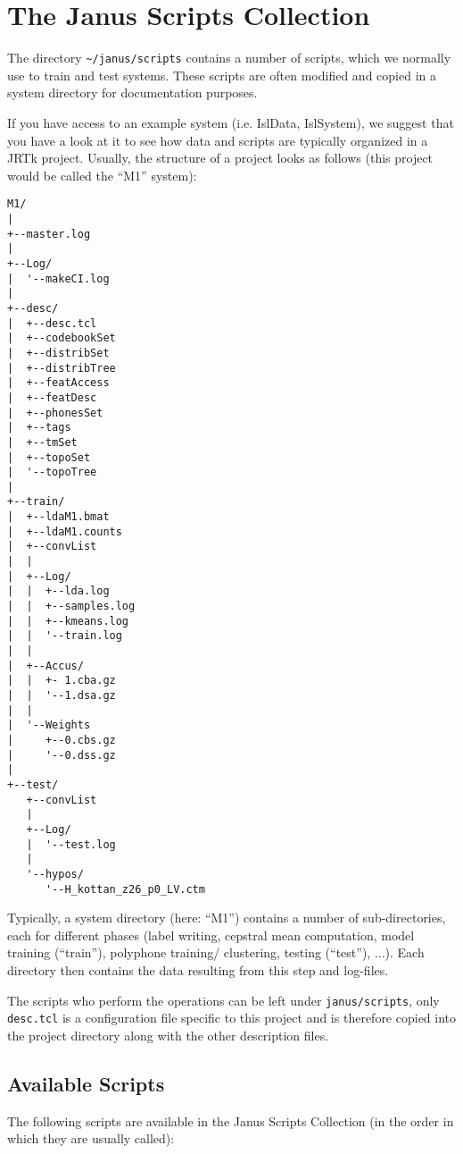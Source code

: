 \section{The Janus Scripts Collection} \label{janus:scripts}

The  directory  \texttt{\~{ }/janus/scripts}  contains  a  number  of
scripts, which   we  normally use  to train  and   test systems. These
scripts  are  often modified and    copied in a  system  directory for
documentation purposes.

If you have access to an example system  (i.e. IslData, IslSystem), we
suggest that  you have a  look at it  to see how  data and scripts are
typically  organized in a  JRTk project.  Usually,  the structure of a
project  looks as  follows (this  project  would be called the  ``M1''
system):

{\small
\begin{verbatim}
M1/
|
+--master.log
|
+--Log/
|  '--makeCI.log
|    
+--desc/
|  +--desc.tcl
|  +--codebookSet
|  +--distribSet
|  +--distribTree
|  +--featAccess
|  +--featDesc
|  +--phonesSet
|  +--tags
|  +--tmSet
|  +--topoSet
|  '--topoTree
|
+--train/
|  +--ldaM1.bmat
|  +--ldaM1.counts
|  +--convList
|  |
|  +--Log/
|  |  +--lda.log
|  |  +--samples.log
|  |  +--kmeans.log
|  |  '--train.log
|  |
|  +--Accus/
|  |  +- 1.cba.gz
|  |  '--1.dsa.gz
|  |
|  '--Weights
|     +--0.cbs.gz
|     '--0.dss.gz
|
+--test/
   +--convList
   |
   +--Log/
   |  '--test.log
   |
   '--hypos/
      '--H_kottan_z26_p0_LV.ctm
\end{verbatim}
}

Typically, a  system  directory (here:  ``M1'')  contains a number  of
sub-directories, each  for  different phases (label  writing, cepstral
mean computation,  model  training (``train''),   polyphone  training/
clustering, testing (``test''), ...). Each directory then contains the
data resulting from this step and log-files.

The   scripts   who   perform   the  operations   can   be left  under
\texttt{janus/scripts}, only \texttt{desc.tcl} is a configuration file
specific to  this project  and  is therefore copied into  the  project
directory along with the other description files.

\subsection{Available Scripts}

The following scripts are available in the Janus Scripts Collection
(in the order in which they are usually called):

